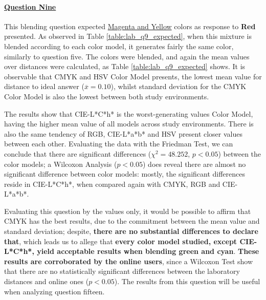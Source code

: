 \paragraph{\ul{Question Nine}}
%
This blending question expected \ul{Magenta and Yellow} colors as response to \textbf{Red} presented. As observed in Table \ref{table:lab_q9_expected}, when this mixture is blended according
to each color model, it generates fairly the same color, similarly to question five.
The colors were blended, and again the mean values over distances were calculated, as Table \ref{table:lab_q9_expected} shows. It is observable that CMYK and HSV Color Model presents,
the lowest mean value for distance to ideal answer ($\overline{x} = 0.10$), whilst standard deviation for the CMYK Color Model is also the lowest between both study environments. \par
%
The results show that CIE-L*C*h* is the worst-generating values Color Model, having the higher mean value of all models across study environments. There is also the same tendency of RGB,
CIE-L*a*b* and HSV present closer values between each other. Evaluating the data with the Friedman Test, we can conclude that there are significant differences ($\chi^2 = 48.252$, $p < 0.05$)
between the color models; a Wilcoxon Analysis ($p < 0.05$) does reveal there are almost no significant difference between color models: mostly, the significant differences reside in CIE-L*C*h*, when
compared again with CMYK, RGB and CIE-L*a*b*. \par
%
Evaluating this question by the values only, it would be possible to affirm that CMYK has the best results, due to the commitment between the mean value and standard deviation; despite,
\textbf{there are no substantial differences to declare that}, which leads us to allege that \textbf{every color model studied, except CIE-L*C*h*, yield acceptable results when blending green and cyan}.
\textbf{These results are corroborated by the online users}, since a Wilcoxon Test show that there are no statistically significant differences between the laboratory distances and online ones ($p < 0.05$).
The results from this question will be useful when analyzing question fifteen.
%
